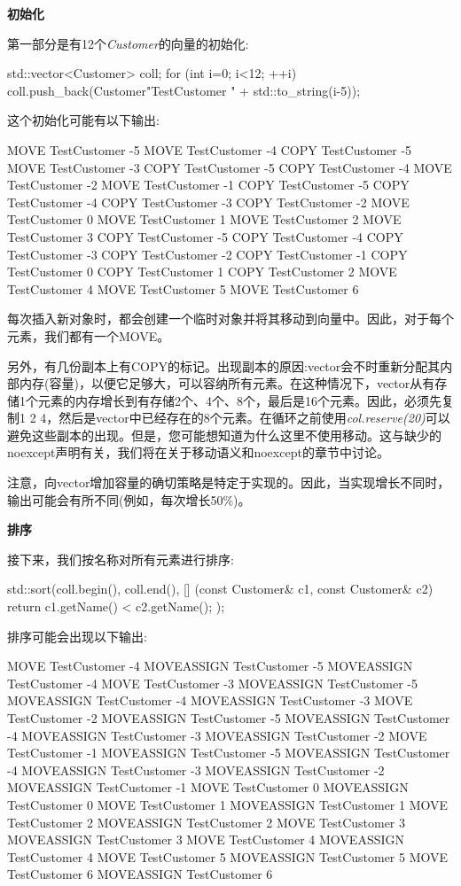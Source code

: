 \textbf{初始化}

第一部分是有12个\textit{Customer}的向量的初始化:

\begin{cppcode}
std::vector<Customer> coll;
for (int i=0; i<12; ++i) {
	coll.push_back(Customer{"TestCustomer " + std::to_string(i-5)});
}
\end{cppcode}

这个初始化可能有以下输出:

\begin{outputcode}
MOVE TestCustomer -5
MOVE TestCustomer -4
COPY TestCustomer -5
MOVE TestCustomer -3
COPY TestCustomer -5
COPY TestCustomer -4
MOVE TestCustomer -2
MOVE TestCustomer -1
COPY TestCustomer -5
COPY TestCustomer -4
COPY TestCustomer -3
COPY TestCustomer -2
MOVE TestCustomer 0
MOVE TestCustomer 1
MOVE TestCustomer 2
MOVE TestCustomer 3
COPY TestCustomer -5
COPY TestCustomer -4
COPY TestCustomer -3
COPY TestCustomer -2
COPY TestCustomer -1
COPY TestCustomer 0
COPY TestCustomer 1
COPY TestCustomer 2
MOVE TestCustomer 4
MOVE TestCustomer 5
MOVE TestCustomer 6
\end{outputcode}

每次插入新对象时，都会创建一个临时对象并将其移动到向量中。因此，对于每个元素，我们都有一个MOVE。

另外，有几份副本上有COPY的标记。出现副本的原因:vector会不时重新分配其内部内存(容量)，以便它足够大，可以容纳所有元素。在这种情况下，vector从有存储1个元素的内存增长到有存储2个、4个、8个，最后是16个元素。因此，必须先复制1 2 4，然后是vector中已经存在的8个元素。在循环之前使用\textit{col.reserve(20)}可以避免这些副本的出现。但是，您可能想知道为什么这里不使用移动。这与缺少的noexcept声明有关，我们将在关于移动语义和noexcept的章节中讨论。

注意，向vector增加容量的确切策略是特定于实现的。因此，当实现增长不同时，输出可能会有所不同(例如，每次增长50\%)。

\textbf{排序}

接下来，我们按名称对所有元素进行排序:

\begin{cppcode}
std::sort(coll.begin(), coll.end(),
	[] (const Customer& c1, const Customer& c2) {
		return c1.getName() < c2.getName();
	});
\end{cppcode}

排序可能会出现以下输出:

\begin{outputcode}
MOVE TestCustomer -4
MOVEASSIGN TestCustomer -5
MOVEASSIGN TestCustomer -4
MOVE TestCustomer -3
MOVEASSIGN TestCustomer -5
MOVEASSIGN TestCustomer -4
MOVEASSIGN TestCustomer -3
MOVE TestCustomer -2
MOVEASSIGN TestCustomer -5
MOVEASSIGN TestCustomer -4
MOVEASSIGN TestCustomer -3
MOVEASSIGN TestCustomer -2
MOVE TestCustomer -1
MOVEASSIGN TestCustomer -5
MOVEASSIGN TestCustomer -4
MOVEASSIGN TestCustomer -3
MOVEASSIGN TestCustomer -2
MOVEASSIGN TestCustomer -1
MOVE TestCustomer 0
MOVEASSIGN TestCustomer 0
MOVE TestCustomer 1
MOVEASSIGN TestCustomer 1
MOVE TestCustomer 2
MOVEASSIGN TestCustomer 2
MOVE TestCustomer 3
MOVEASSIGN TestCustomer 3
MOVE TestCustomer 4
MOVEASSIGN TestCustomer 4
MOVE TestCustomer 5
MOVEASSIGN TestCustomer 5
MOVE TestCustomer 6
MOVEASSIGN TestCustomer 6
\end{outputcode}

